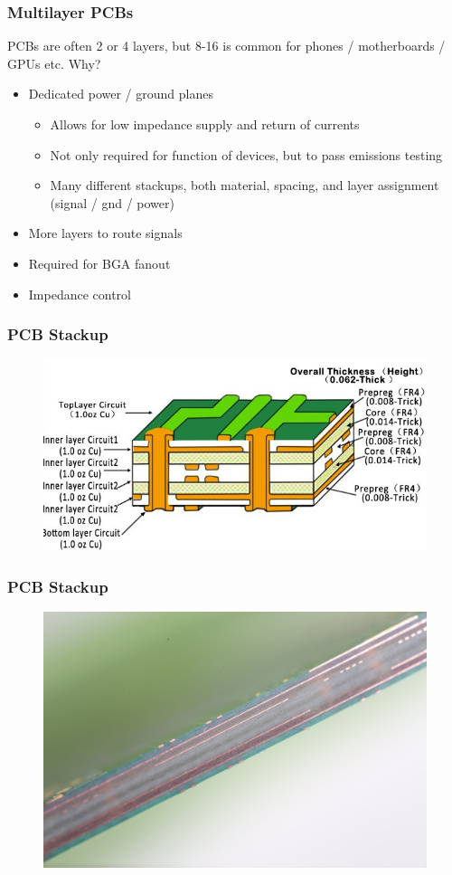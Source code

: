\documentclass[t]{beamer}
\begin{document}
\begin{frame}
\frametitle{Multilayer PCBs}
PCBs are often 2 or 4 layers, but 8-16 is common for phones / motherboards / GPUs etc. Why?
\begin{itemize}
	\item Dedicated power / ground planes
		\begin{itemize}
			\item Allows for low impedance supply and return of currents
			\item Not only required for function of devices, but to pass emissions testing
			\item Many different stackups, both material, spacing, and layer assignment (signal / gnd / power)
		\end{itemize}
	\item More layers to route signals
	\item Required for BGA fanout
	\item Impedance control
\end{itemize}
\end{frame}
\begin{frame}
	\frametitle{PCB Stackup}
	\begin{figure}
		\includegraphics[width=\linewidth]{6layer.jpg}
	\end{figure}
\end{frame}
\begin{frame}
	\frametitle{PCB Stackup}
	\begin{figure}
		\includegraphics[width=0.8\linewidth]{crossSection1.jpg}
	\end{figure}
\end{frame}
\end{document}
